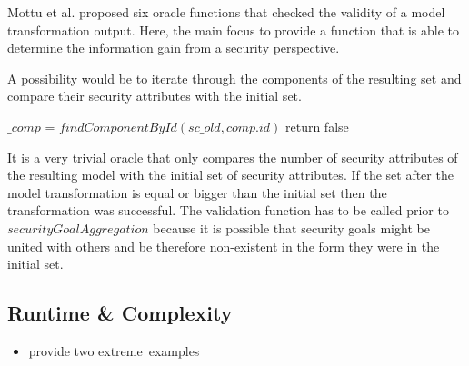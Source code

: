 Mottu et al. \cite{mottu} proposed six oracle functions that checked the validity of a model transformation output. Here, the main focus to provide a function that is able to determine the information gain from a security perspective.

A possibility would be to iterate through the components of the resulting set and compare their security attributes with the initial set.

\begin{algorithm}[H]
\begin{algorithmic}
\State $\_comp$ = $findComponentById(sc\_old, comp.id)$
return false
\EndIf
\EndFor
\EndFor
\EndFunction
\end{algorithmic}
\end{algorithm}

It is a very trivial oracle that only compares the number of security attributes of the resulting model with the initial set of security attributes. If the set after the model transformation is equal or bigger than the initial set then the transformation was successful. The validation function has to be called prior to $securityGoalAggregation$ because it is possible that security goals might be united with others and be therefore non-existent in the form they were in the initial set. 

\subsection{Runtime \& Complexity}

\begin{itemize}
\item provide two \glqq extreme\grqq \ examples
\end{itemize}

